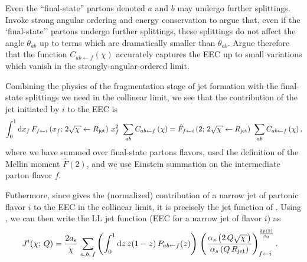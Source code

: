 
\begin{exercise}
   Even the ``final-state'' partons denoted \(a\) and \(b\) may undergo further splittings.
   Invoke strong angular ordering and energy conservation to argue that, even if the `final-state'' partons undergo further splittings, these splittings do not affect the angle \(\theta_{ab}\) up to terms which are dramatically smaller than \(\theta_{ab}\).
   Argue therefore that the function \(C_{ab\leftarrow f}(\chi)\) accurately captures the EEC up to small variations which vanish in the strongly-angular-ordered limit.
\end{exercise}



Combining the physics of the fragmentation stage of jet formation with the final-state splittings we need in the collinear limit, we see that the contribution of the jet initiated by \(i\) to the EEC is
\begin{align}
    \label{eq:jet_fn_ll_0}
    \int_0^1
    \dd x_f
    \,
    F_{f \leftarrow i}\le(x_f;\,
    2 \sqrt{\chi}\leftarrow \Rjet\ri)
    \,
    x_f^2
    \,\,
    \sum_{ab} C_{ab\leftarrow f}\le(\chi\ri)
    =
    \hat{F}_{f \leftarrow i}
    \le(2;\,
    2 \sqrt{\chi}\leftarrow \Rjet\ri)
    \,\,
    \sum_{ab} C_{ab\leftarrow f}\le(\chi\ri)
    ,
\end{align}
%
where we have summed over final-state partons flavors, used the definition of the Mellin moment \(\hat{F}(2)\), and we use Einstein summation on the intermediate parton flavor \(f\).

Futhermore, since  gives the (normalized) contribution of a narrow jet of partonic flavor \(i\) to the EEC in the collinear limit, it is precisely the jet function of .
%
Using , we can then write the LL jet function (EEC for a narrow jet of flavor \(i\)) as
\begin{align}
    \label{eq:eec_jet_fn_ll_1}
    J^i(\chi; \, Q)
    &=
    \frac{2 \as}{\chi}
    \,
    \sum_{a,b,\,f}
    \le(
        \int_0^1 \dd z \, z (1-z) \,
        P_{ab \leftarrow f}(z)
    \ri)
    \,
    \le(
        \frac{\alpha_s\le(2\,Q\sqrt{\chi}\ri)}
        {\alpha_s\le(Q\,\Rjet\ri)}
    \ri)
    ^
    {\frac{2\hat{p}(2)}{\beta_0}}
    _{f\leftarrow i}
    .
\end{align}



